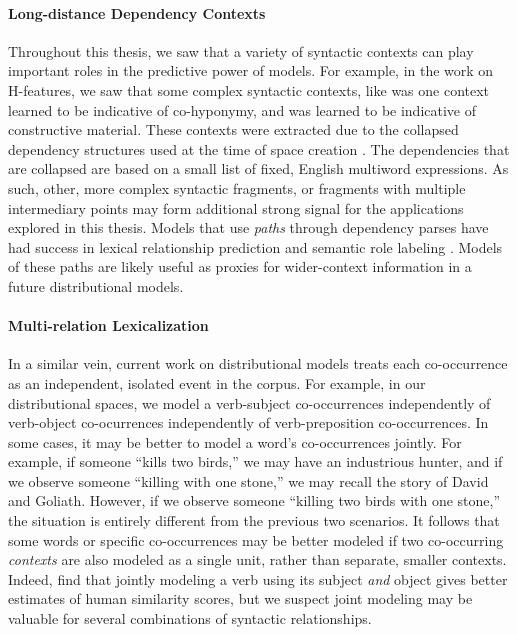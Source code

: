\paragraph{Long-distance Dependency Contexts}
Throughout this thesis, we saw that a variety of syntactic contexts can play
important roles in the predictive power of models. For example, in the work on
H-features, we saw that some complex syntactic contexts, like
 was one context learned to be indicative of
co-hyponymy, and  was learned to be indicative
of constructive material. These contexts were extracted due to the collapsed
dependency structures used at the time of space creation
\cite{marneffe:2008:techreport}. The dependencies that are collapsed are
based on a small list of fixed, English multiword expressions. As such,
other, more complex syntactic fragments, or fragments with multiple
intermediary points may form additional strong signal for the applications
explored in this thesis. Models that use {\em paths} through dependency
parses have had success in lexical relationship prediction
\cite{shwartz:2016:acl,shwartz:2016:cogalex2} and semantic role labeling
\cite{roth:2016:acl}. Models of these paths are likely useful as proxies for
wider-context information in a future distributional models.

\paragraph{Multi-relation Lexicalization}
In a similar vein, current work on distributional models treats each
co-occurrence as an independent, isolated event in the corpus. For example, in
our distributional spaces, we model a verb-subject co-occurrences independently
of verb-object co-ocurrences independently of verb-preposition co-occurrences.
In some cases, it may be better to model a word's co-occurrences jointly. For
example, if someone ``kills two birds,'' we may have an industrious hunter, and
if we observe someone ``killing with one stone,'' we may recall the story of
David and Goliath. However, if we observe someone ``killing two birds with one
stone,'' the situation is entirely different from the previous two scenarios.
It follows that some words or specific co-occurrences may be better modeled
if two co-occurring {\em contexts} are also modeled as a single unit, rather
than separate, smaller contexts.
Indeed,  find that jointly modeling a verb using
its subject {\em and} object gives better estimates of human similarity
scores, but we suspect joint modeling may be valuable for several combinations
of syntactic relationships.

